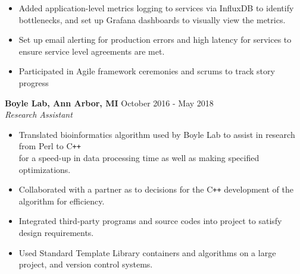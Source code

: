 \documentclass[margin]{res}
\begin{document}
\begin{resume}
\begin{itemize}
                  \item Added application-level
                  metrics logging to services via InfluxDB to identify bottlenecks,
                  and set up Grafana dashboards to visually view the metrics.

                  \item Set up email alerting for production errors and high latency
                  for services to ensure service level agreements are met.

                  \item Participated in Agile framework ceremonies and 
                  scrums to track story progress

                \end{itemize}

                \textbf{Boyle Lab, Ann Arbor, MI}
                \hfill October 2016 - May 2018 \\
                {\sl Research Assistant}
                 \begin{itemize}  \itemsep -2pt %
                 \item Translated bioinformatics algorithm used by Boyle Lab to assist in research from Perl to C\texttt{++} \\for a
                    speed-up in data processing time as well as making specified optimizations.
                 \item Collaborated with a partner as to decisions for the C\texttt{++} development of the algorithm for efficiency.
                 \item Integrated third-party programs and source codes into project to satisfy design requirements.
                 \item Used Standard Template Library containers and algorithms on a large project, 
                 and version control systems.
                \end{itemize}



\end{resume}
\end{document}
